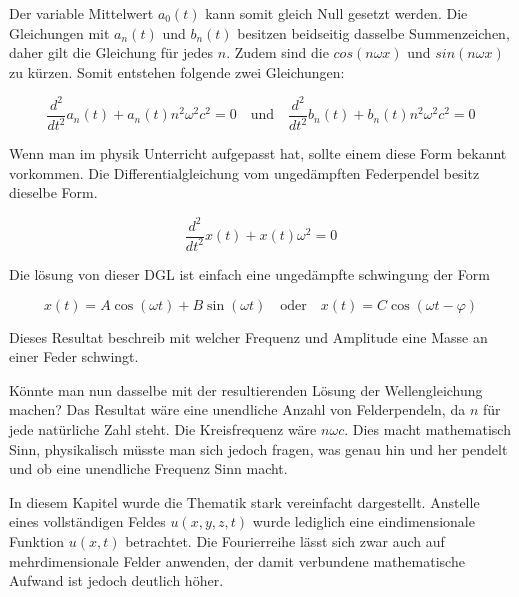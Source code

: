 Der variable Mittelwert $a_0(t)$ kann somit gleich Null gesetzt werden.
Die Gleichungen mit $a_n(t)$ und $b_n(t)$ besitzen beidseitig dasselbe Summenzeichen, daher gilt die Gleichung für jedes $n$. 
Zudem sind die $cos(n\omega x)$ und $sin(n\omega x)$ zu kürzen. 
Somit entstehen folgende zwei Gleichungen:

\begin{equation}
	\frac{d^2}{dt^2} a_n(t) + a_n(t) n^2 \omega^2 c^2 = 0
	  \quad   \text{und} \quad  \frac{d^2}{dt^2} b_n(t) + b_n(t) n^2 \omega^2 c^2 = 0
\end{equation}

Wenn man im physik Unterricht aufgepasst hat, sollte einem diese Form bekannt vorkommen. Die Differentialgleichung vom ungedämpften Federpendel besitz dieselbe Form. 

\begin{equation}
	\frac{d^2}{dt^2} x(t) + x(t) \omega^2  = 0
\end{equation}

Die lösung von dieser DGL ist einfach eine ungedämpfte schwingung der Form 

\begin{equation}
x(t) = A \cos(\omega t) + B \sin(\omega t) \quad \text{oder} \quad x(t) = C \cos(\omega t - \varphi)
\end{equation}

Dieses Resultat beschreib mit welcher Frequenz und Amplitude eine Masse an einer Feder schwingt. 

Könnte man nun dasselbe mit der resultierenden Lösung der Wellengleichung machen?
Das Resultat wäre eine unendliche Anzahl von Felderpendeln, da $n$ für jede natürliche Zahl steht. 
Die Kreisfrequenz wäre  $n \omega c$. 
Dies macht mathematisch Sinn, physikalisch müsste man sich jedoch fragen, was genau hin und her pendelt und ob eine unendliche Frequenz Sinn macht.


In diesem Kapitel wurde die Thematik stark vereinfacht dargestellt. 
Anstelle eines vollständigen Feldes $u(x,y,z,t)$ wurde lediglich eine eindimensionale Funktion $u(x,t)$ betrachtet. Die Fourierreihe lässt sich zwar auch auf mehrdimensionale Felder anwenden, der damit verbundene mathematische Aufwand ist jedoch deutlich höher. 








